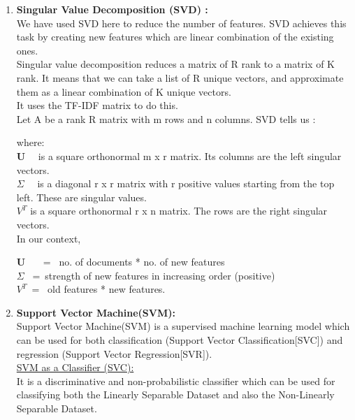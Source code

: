 \documentclass{report}
\begin{document}
\begin{multicols}{2}
\begin{enumerate}[label=\Roman*.]
 \item \textbf{Singular Value Decomposition (SVD) :}\\
We have used SVD here to reduce the number of features. SVD achieves this task by creating new features which are linear combination of the existing ones.\\
Singular value decomposition reduces a matrix of R rank to a matrix of K rank.
It means that we can take a list of R unique vectors, and approximate them as a linear combination of K unique vectors.\\
It uses the TF-IDF matrix to do this.\\
Let A be a rank R matrix with m rows and n columns. SVD tells us :
\begin{center} 
{\huge {}}
\end{center}
where:\\
{\huge \textbf{U} } \ \ is a square orthonormal m x r matrix. Its columns are the left singular vectors.\\
\linebreak
{\huge \textbf{\(\Sigma \)}} \ \ is a diagonal r x r matrix with r positive values starting from the top left. These are  singular values.\\
\linebreak
{\huge \textbf{\(V^T \)} } is a square orthonormal r x n matrix. The rows are the right singular vectors.\\
In our context,

{\huge \textbf{U}} \ \ \ = \  no. of documents * no. of new features\\ \linebreak
{\huge \textbf{\(\Sigma \)} } \ =\  strength of new features in increasing order (positive)\\ \linebreak
{\huge \textbf{\(V^T \)}}\ = \  old features * new features.\\

\item \textbf{Support Vector Machine(SVM):}\\
Support Vector Machine(SVM) is a supervised machine learning model which can be used for both classification (Support Vector Classification[SVC]) and regression (Support Vector Regression[SVR]).\\ \linebreak
\underline{SVM as a Classifier (SVC):}\\ \linebreak
It is a discriminative and non-probabilistic classifier which can be used for classifying both the Linearly Separable Dataset and also the Non-Linearly Separable Dataset.


\end{enumerate}
\end{multicols}
\end{document}

